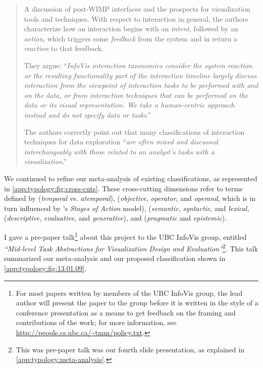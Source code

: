 \begin{quotation}
    A discussion of post-\ac{WIMP} interfaces and the prospects for visualization tools and techniques. 
    With respect to interaction in general, the authors characterize how an interaction begins with an {\it intent}, followed by an {\it action}, which triggers some {\it feedback} from the system and in return a {\it reaction} to that feedback.
    
    They argue: ``{\it InfoVis interaction taxonomies consider the system reaction or the resulting functionality part of the interaction timeline largely discuss interaction from the viewpoint of interaction tasks to be performed with and on the data, or from interaction techniques that can be performed on the data or its visual representation. We take a human-centric approach instead and do not specify data or tasks}.''
    
    The authors correctly point out that many classifications of interaction techniques for data exploration ``{\it are often mixed and discussed interchangeably with those related to an analyst's tasks with a visualization}.''
\end{quotation}

We continued to refine our meta-analysis of existing classifications, as represented in \autoref{app:typology:fig:cross-cuts}.
These cross-cutting dimensions refer to terms defined by \citet{Chi1998} ({\it temporal} vs. {\it atemporal}), \citet{Roth2012} ({\it objective}, {\it operator}, and {\it operand}, which is in turn influenced by \citet{Norman1988}'s {\it Stages of Action} model), \citet{Chuah1996} ({\it semantic}, {\it syntactic}, and {\it lexical}, \citet{Beaudouin-Lafon2004} ({\it descriptive}, {\it evaluative}, and {\it generative}), and \citet{Kirsh1994} ({\it pragmatic} and {\it epistemic}).

I gave a pre-paper talk\footnote{For most papers written by members of the UBC InfoVis group, the lead author will present the paper to the group before it is written in the style of a conference presentation as a means to get feedback on the framing and contributions of the work; for more information, see \url{http://people.cs.ubc.ca/~tmm/policy.txt}.} about this project to the UBC InfoVis group, entitled {\it ``Mid-level Task Abstractions for Visualization Design and Evaluation''}\footnote{This was pre-paper talk was our fourth slide presentation, as explained in \autoref{app:typology:meta-analysis}.}.
This talk summarized our meta-analysis and our proposed classification shown in \autoref{app:typology:fig:13.01.09}.

